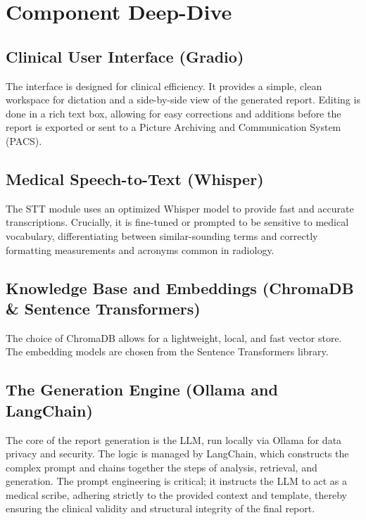 \section{Component Deep-Dive}

\subsection{Clinical User Interface (Gradio)}
The interface is designed for clinical efficiency. It provides a simple, clean workspace for dictation and a side-by-side view of the generated report. Editing is done in a rich text box, allowing for easy corrections and additions before the report is exported or sent to a Picture Archiving and Communication System (PACS).

\subsection{Medical Speech-to-Text (Whisper)}
The STT module uses an optimized Whisper model to provide fast and accurate transcriptions. Crucially, it is fine-tuned or prompted to be sensitive to medical vocabulary, differentiating between similar-sounding terms and correctly formatting measurements and acronyms common in radiology.

\subsection{Knowledge Base and Embeddings (ChromaDB \& Sentence Transformers)}
The choice of ChromaDB allows for a lightweight, local, and fast vector store. The embedding models are chosen from the Sentence Transformers library.

\subsection{The Generation Engine (Ollama and LangChain)}
The core of the report generation is the LLM, run locally via Ollama for data privacy and security. The logic is managed by LangChain, which constructs the complex prompt and chains together the steps of analysis, retrieval, and generation. The prompt engineering is critical; it instructs the LLM to act as a medical scribe, adhering strictly to the provided context and template, thereby ensuring the clinical validity and structural integrity of the final report.